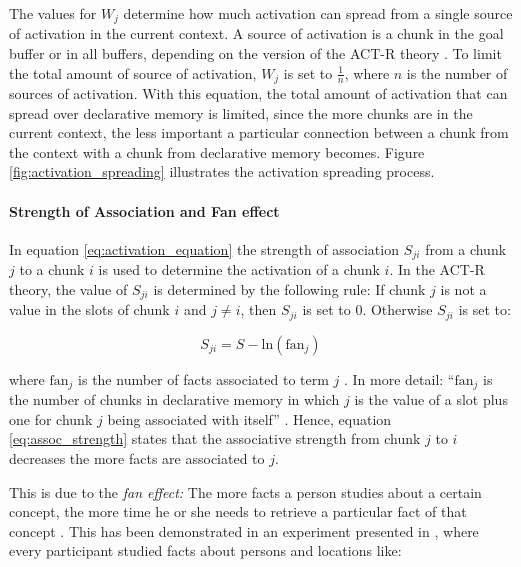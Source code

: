 The values for $W_j$ determine how much activation can spread from a single source of activation in the current context. A source of activation is a chunk in the goal buffer or in all buffers, %
depending on the version of the ACT-R theory \cites[1042]{anderson_integrated_2004}[33]{taatgen_modeling_2006}[unit 5, p. 1]{actr_tutorial}. To limit the total amount of source of activation, $W_j$ is set to $\frac{1}{n}$, where $n$ is the number of sources of activation. With this equation, the total amount of activation that can spread over declarative memory is limited, since the more chunks are in the current context, the less important a particular connection between a chunk from the context with a chunk from declarative memory becomes. Figure \ref{fig:activation_spreading} illustrates the activation spreading process.

\paragraph{Strength of Association and Fan effect}
\label{actr:fan_effect}

In equation \eqref{eq:activation_equation} the strength of association $S_{ji}$ from a chunk $j$ to a chunk $i$ is used to determine the activation of a chunk $i$.  In the ACT-R theory, the value of $S_{ji}$ is determined by the following rule: If chunk $j$ is not a value in the slots of chunk $i$ and $j \neq i$, then $S_{ji}$ is set to 0. Otherwise $S_{ji}$ is set to: 

\begin{equation}
\label{eq:assoc_strength}
S_{ji} = S - \mathrm{ln}(\mathrm{fan}_j)
\end{equation}

where $\mathrm{fan}_j$ is the number of facts associated to term $j$ \cite[1042]{anderson_implications_2000}. In more detail: ``$\mathrm{fan}_j$ is the number of chunks in declarative memory in which $j$ is the value of a slot plus one for chunk $j$ being associated with itself'' \cite[unit 5, p. 2]{actr_tutorial}. Hence, equation \eqref{eq:assoc_strength} states that the associative strength from chunk $j$ to $i$ decreases the more facts are associated to $j$.

This is due to the \emph{fan effect:} The more facts a person studies about a certain concept, the more time he or she needs to retrieve a particular fact of that concept \cite[186]{anderson_fan_1999}. This has been demonstrated in an experiment presented in \cite{anderson_fan_1999}, where every participant studied facts about persons and locations like:

